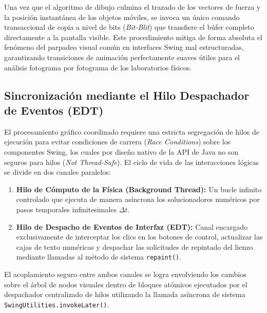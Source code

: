 \documentclass[11pt,a4paper]{article}
\begin{document}
	Una vez que el algoritmo de dibujo culmina el trazado de los vectores de fuerza y la posición instantánea de los objetos móviles, se invoca un único comando transaccional de copia a nivel de bits (\textit{Bit-Blit}) que transfiere el búfer completo directamente a la pantalla visible. Este procedimiento mitiga de forma absoluta el fenómeno del parpadeo visual común en interfaces Swing mal estructuradas, garantizando transiciones de animación perfectamente suaves útiles para el análisis fotograma por fotograma de los laboratorios físicos.
	
	\subsection{Sincronización mediante el Hilo Despachador de Eventos (EDT)}
	El procesamiento gráfico coordinado requiere una estricta segregación de hilos de ejecución para evitar condiciones de carrera (\textit{Race Conditions}) sobre los componentes Swing, los cuales por diseño nativo de la API de Java no son seguros para hilos (\textit{Not Thread-Safe}). El ciclo de vida de las interacciones lógicas se divide en dos canales paralelos:
	\begin{enumerate}[label=\textbf{\arabic*.}]
		\item \textbf{Hilo de Cómputo de la Física (Background Thread):} Un bucle infinito controlado que ejecuta de manera asíncrona los solucionadores numéricos por pasos temporales infinitesimales $\Delta t$.
		\item \textbf{Hilo de Despacho de Eventos de Interfaz (EDT):} Canal encargado exclusivamente de interceptar los clics en los botones de control, actualizar las cajas de texto numéricas y despachar las solicitudes de repintado del lienzo mediante llamadas al método de sistema \texttt{repaint()}.
	\end{enumerate}
	El acoplamiento seguro entre ambos canales se logra envolviendo los cambios sobre el árbol de nodos visuales dentro de bloques atómicos ejecutados por el despachador centralizado de hilos utilizando la llamada asíncrona de sistema \texttt{SwingUtilities.invokeLater()}.
	
\end{document}
